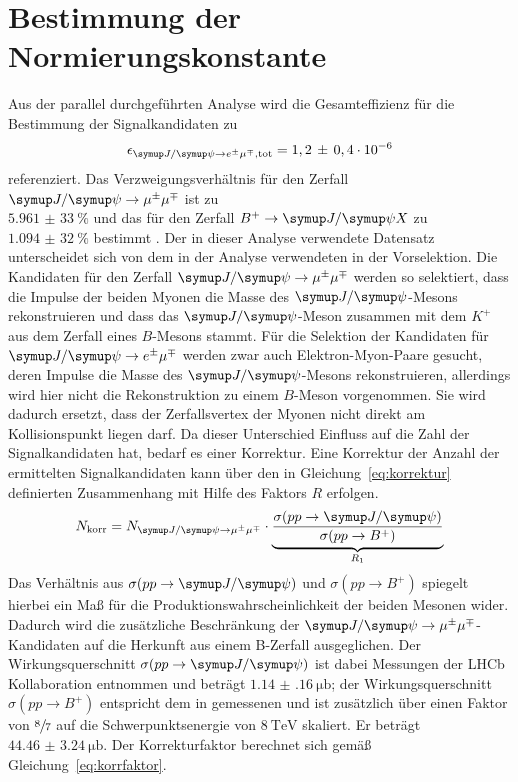 \section{Bestimmung der Normierungskonstante}
\label{sec:norm}
Aus der parallel durchgeführten Analyse \cite{ba-maik} wird die Gesamteffizienz für die Bestimmung der Signalkandidaten zu
%
\begin{equation}
  \epsilon_{\signal, \text{tot}}=1,2\,\pm\,0,4\cdot 10^{-6}
\end{equation}
%
referenziert. Das Verzweigungsverhältnis für den Zerfall $\kontroll$ ist zu \\$\SI{5,961(33)}{\percent}$ und das für den Zerfall $B^{+}\rightarrow\jpsi X$ zu $\SI{1,094(32)}{\percent}$ bestimmt \cite{pdg}. Der in
dieser Analyse verwendete Datensatz unterscheidet sich von dem in der Analyse \cite{ba-maik} verwendeten in der Vorselektion. Die
Kandidaten für den Zerfall $\kontroll$ werden so selektiert, dass die Impulse der beiden Myonen die Masse des $\jpsi$-Mesons
rekonstruieren und dass das $\jpsi$-Meson zusammen mit dem $K^+$ aus dem Zerfall eines $B$-Mesons stammt. Für die Selektion der Kandidaten für $\signal$ werden zwar auch Elektron-Myon-Paare gesucht, deren Impulse die Masse des $\jpsi$-Mesons rekonstruieren, allerdings wird
hier nicht die Rekonstruktion zu einem $B$-Meson vorgenommen. Sie wird dadurch ersetzt, dass der Zerfallsvertex der Myonen nicht direkt
am Kollisionspunkt liegen darf. Da dieser Unterschied Einfluss auf die Zahl der Signalkandidaten hat, bedarf es einer Korrektur. Eine Korrektur der Anzahl der ermittelten Signalkandidaten kann über den in Gleichung~\eqref{eq:korrektur} definierten Zusammenhang mit Hilfe des Faktors $R$ erfolgen.
%
\begin{equation}
  N_\text{korr}=N_{\kontroll}\cdot\underbrace{\frac{\sigma(pp\rightarrow\jpsi)}{\sigma(pp\rightarrow B^+)}}_{R_1}
  \label{eq:korrektur}
\end{equation}
%
Das Verhältnis aus $\sigma(pp\rightarrow\jpsi)$ und $\sigma(pp\rightarrow B^+)$ spiegelt hierbei ein Maß für die
Produktionswahrscheinlichkeit der beiden Mesonen wider. Dadurch wird die zusätzliche Beschränkung der $\kontroll$-Kandidaten auf die Herkunft aus einem B-Zerfall ausgeglichen. Der Wirkungsquerschnitt $\sigma(pp\rightarrow\jpsi)$ ist dabei Messungen der LHCb Kollaboration entnommen \cite{sigmajpsi} und beträgt $\SI{1.14(16)}{\micro\barn}$; der Wirkungsquerschnitt $\sigma(pp\rightarrow B^+)$ entspricht dem in \cite{sigmaB} gemessenen und ist zusätzlich über einen Faktor von $\sfrac{8}{7}$ auf die Schwerpunktsenergie von $\SI{8}{\tera\electronvolt}$ skaliert. Er beträgt $\SI{44.46(324)}{\micro\barn}$. Der Korrekturfaktor berechnet sich gemäß Gleichung~\eqref{eq:korrfaktor}.
